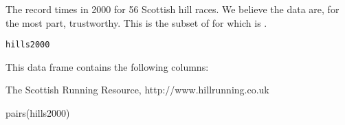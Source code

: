 \begin{Description}\relax
The record times in 2000 for 56 Scottish hill races.  We
believe the data are, for the most part, trustworthy.  
This is the subset of  for which 
is .
\end{Description}
\begin{Usage}
\begin{verbatim}hills2000\end{verbatim}
\end{Usage}
\begin{Format}\relax
This data frame contains the following columns:
\end{Format}
\begin{Source}\relax
The Scottish Running Resource, http://www.hillrunning.co.uk
\end{Source}
\begin{Examples}
\begin{ExampleCode}
    pairs(hills2000)
\end{ExampleCode}
\end{Examples}

